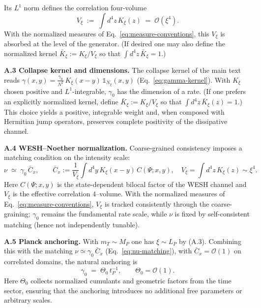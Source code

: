 \documentclass[12pt,a4paper]{article}
\numberwithin{equation}{section}
\begin{document}
\noindent Its $L^1$ norm defines the correlation four-volume
\begin{equation}
V_\xi \;:=\;\int d^4z\,K_\xi(z)\;=\;\mathcal O(\xi^4).
\tag{A.4$'$}
\end{equation}
With the normalized measures of Eq.~\eqref{eq:measure-conventions}, this $V_\xi$ is absorbed
at the level of the generator. (If desired one may also define the normalized kernel
$\bar K_\xi:=K_\xi/V_\xi$ so that $\int d^4z\,\bar K_\xi=1$.)

\vspace{0.3cm}
\noindent\textbf{A.3 Collapse kernel and dimensions.}
The collapse kernel of the main text reads \(\gamma(x,y)=\frac{\gamma_0}{N^2}\,K_\xi(x-y)\,\mathbb{1}_{N_\xi}(x,y)\) (Eq.~\eqref{eq:gamma-kernel}). With $K_\xi$ chosen positive and $L^1$-integrable, $\gamma_0$ has the dimension of a rate.
(If one prefers an explicitly normalized kernel, define $\bar K_\xi:=K_\xi/V_\xi$ so that
$\int d^4z\,\bar K_\xi(z)=1$.) This choice yields a positive, integrable weight and, when composed with Hermitian jump operators, preserves complete positivity of the dissipative channel.

\vspace{0.3cm}
\noindent\textbf{A.4 WESH–Noether normalization.}
Coarse-grained consistency imposes a matching condition on the intensity scale:
\begin{equation}
\nu \;\simeq\; \gamma_0\,\bar C_x,\qquad 
\bar C_x:=\frac{1}{V_\xi}\!\int d^4y\,K_\xi(x-y)\,C(\Psi;x,y),\quad 
V_\xi=\!\int d^4z\,K_\xi(z)\sim \xi^4.
\label{eq:nu-matching} \tag{A.5}
\end{equation}
Here \(C(\Psi;x,y)\) is the state-dependent bilocal factor of the WESH channel and \(V_\xi\) is the effective correlation 4–volume. With the normalized measures of Eq.~\eqref{eq:measure-conventions}, $V_\xi$ is tracked consistently through the coarse-graining; $\gamma_0$ remains the fundamental rate scale, while $\nu$ is fixed by self-consistent matching (hence not independently tunable).

\vspace{0.3cm}
\noindent\textbf{A.5 Planck anchoring.}
With $m_T\sim M_P$ one has $\xi\sim L_P$ by (A.3). Combining this with the matching $\nu\simeq\gamma_0\,\bar C_x$ (Eq.~\eqref{eq:nu-matching}), with $\bar C_x=\mathcal O(1)$ on correlated domains, the natural anchoring is
\begin{equation}
\gamma_0 \;=\; \Theta_0\,t_P^{-1},\qquad \Theta_0=\mathcal O(1).
\tag{A.6}
\end{equation}
Here $\Theta_0$ collects normalized cumulants and geometric factors from the time sector,
ensuring that the anchoring introduces no additional free parameters or arbitrary scales.
\end{document}

